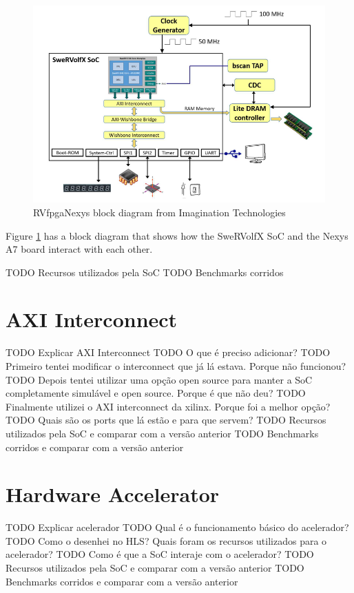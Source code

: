 \begin{figure}[H]
    \centering
    \includegraphics[scale=0.5]{Figures/RVfpgaNexys.png}
    \caption{RVfpgaNexys block diagram from Imagination Technologies}
    \label{fig:RVfpgaNexys}
\end{figure}

Figure \ref{fig:RVfpgaNexys} has a block diagram that shows how the SweRVolfX SoC and the Nexys A7 board interact with each other.

TODO Recursos utilizados pela SoC
TODO Benchmarks corridos

\section{AXI Interconnect}
TODO Explicar AXI Interconnect
TODO O que é preciso adicionar?
TODO Primeiro tentei modificar o interconnect que já lá estava. Porque não funcionou?
TODO Depois tentei utilizar uma opção open source para manter a SoC completamente simulável e open source. Porque é que não deu?
TODO Finalmente utilizei o AXI interconnect da xilinx. Porque foi a melhor opção?
TODO Quais são os ports que lá estão e para que servem?
TODO Recursos utilizados pela SoC e comparar com a versão anterior
TODO Benchmarks corridos e comparar com a versão anterior

\section{Hardware Accelerator}
TODO Explicar acelerador
TODO Qual é o funcionamento básico do acelerador?
TODO Como o desenhei no HLS? Quais foram os recursos utilizados para o acelerador?
TODO Como é que a SoC interaje com o acelerador?
TODO Recursos utilizados pela SoC e comparar com a versão anterior
TODO Benchmarks corridos e comparar com a versão anterior